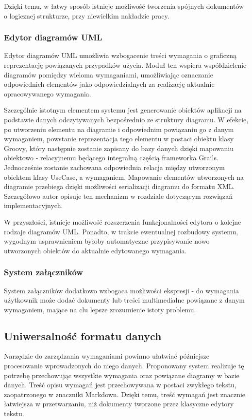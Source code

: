      Dzięki temu, w łatwy sposób istnieje możliwość tworzenia spójnych dokumentów o logicznej strukturze, przy niewielkim nakładzie pracy.

      \subsubsection{Edytor diagramów UML}

      Edytor diagramów UML umożliwia wzbogacenie treści wymagania o graficzną reprezentację powiązanych przypadków użycia. Moduł ten wspiera współdzielenie diagramów pomiędzy wieloma wymaganiami, umożliwiając oznaczanie odpowiednich elementów jako odpowiedzialnych za realizację aktualnie opracowywanego wymagania. 

      Szczególnie istotnym elementem systemu jest generowanie obiektów aplikacji na podstawie danych odczytywanych bezpośrednio ze struktury diagramu. W efekcie, po utworzeniu elementu na diagramie i odpowiednim powiązaniu go z danym wymaganiem, powstanie reprezentacja tego elementu w postaci obiektu klasy Groovy, który następnie zostanie zapisany do bazy danych dzięki mapowaniu obiektowo - relacyjnemu będącego integralną częścią frameworka Grails. Jednocześnie zostanie zachowana odpowiednia relacja między utworzonym obiektem klasy UseCase, a wymaganiem. Mapowanie elementów utworzonych na diagramie przebiega dzięki możliwości serializacji diagramu do formatu XML. Szczegółowo autor opisuje ten mechanizm w rozdziale dotyczącym rozwiązań implementacyjnych.

      W przyszłości, istnieje możliwość rozszerzenia funkcjonalności edytora o kolejne rodzaje diagramów UML. Ponadto, w trakcie ewentualnej rozbudowy systemu, wygodnym usprawnieniem byłoby automatyczne przypisywanie nowo utworzonych obiektów do aktualnie edytowanego wymagania.

      \subsubsection{System załączników}

      System załączników dodatkowo wzbogaca możliwości ekspresji - do wymagania użytkownik może dodać dokumenty lub treści multimedialne powiązane z danym wymaganiem, mające na clu lepsze zrozumienie istoty problemu.

    \subsection{Uniwersalność formatu danych}
      Narzędzie do zarządzania wymaganiami powinno ułatwiać późniejsze procesowanie wprowadzonych do niego danych. Proponowany system realizuje tę potrzebę przechowując wszystkie wymagania oraz powiązane diagramy w bazie danych. Treść opisu wymagań jest przechowywana w postaci zwykłego tekstu, zaopatrzonego w znaczniki Markdown. Dzięki temu, treść wymagań jest znacznie łatwiejsza w przetwarzaniu, niż dokumenty tworzone przez klasyczne edytory tekstu.
      
